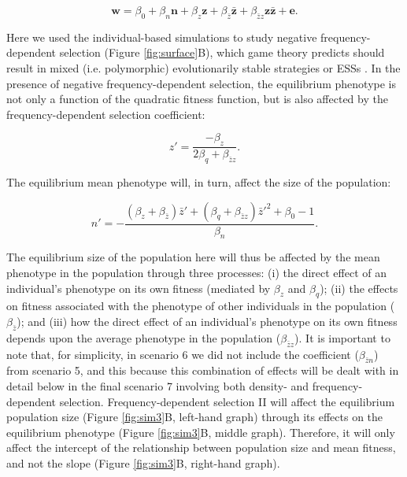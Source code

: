 \documentclass{article}
\begin{document}
\begin{equation} \label{eq: FDS}
\mathbf{w}=\beta_{0} +\beta_{n} \mathbf{n} + \beta_{z} \mathbf{z}+ \beta_{\bar{z}} \mathbf{\bar{z}}  + \beta_{\bar{z}z} \mathbf{z\bar{z}}  +  \mathbf{e}.
\end{equation}

\noindent Here we used the individual-based simulations to study negative frequency-dependent selection (Figure \ref{fig:surface}B), which game theory predicts should result in mixed (i.e. polymorphic) evolutionarily stable strategies or ESSs \citep{MaynardSmith1982, McNamaraLeimar2020}. In the presence of negative frequency-dependent selection, the equilibrium phenotype is not only a function of the quadratic fitness function, but is also affected by the frequency-dependent selection coefficient:

\begin{equation} 
z'=\frac{-\beta_{z}}{2\beta_{q} + \beta_{\bar{z}z}}.
\end{equation} 

\noindent The equilibrium mean phenotype will, in turn, affect the size of the population:

\begin{equation}
n' = -\frac{(\beta_{z}   + \beta_{\bar{z}})\bar{z}' + (\beta_{q} + \beta_{\bar{z}z})\bar{z}'^2+\beta_{0} -1}{\beta_{n}}.
\end{equation}

\noindent The equilibrium size of the population here will thus be affected by the mean phenotype in the population through three processes: (i) the direct effect of an individual's phenotype on its own fitness (mediated by $\beta_z$ and $ \beta_q$); (ii) the effects on fitness associated with the phenotype of other individuals in the population ($\beta_{\bar{z}}$); and (iii) how the direct effect of an individual's phenotype on its own fitness depends upon the average phenotype in the population ($\beta_{\bar{z}z}$). It is important to note that, for simplicity, in scenario 6 we did not include the coefficient ($\beta_{\bar{z}n}$) from scenario 5, and this because this combination of effects will be dealt with in detail below in the final scenario 7 involving both density- and frequency-dependent selection. Frequency-dependent selection II will affect the equilibrium population size (Figure \ref{fig:sim3}B, left-hand graph) through its effects on the equilibrium phenotype (Figure \ref{fig:sim3}B, middle graph). Therefore, it will only affect the intercept of the relationship between population size and mean fitness, and not the slope (Figure \ref{fig:sim3}B, right-hand graph).
 
\end{document}
